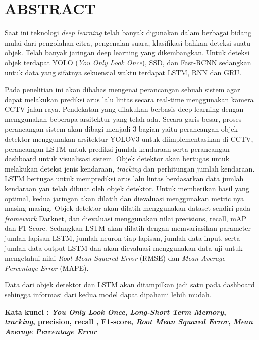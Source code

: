 \documentclass[../thesis.tex]{subfiles}
\begin{document}
\chapter*{ABSTRACT}%
\normalfont
\vspace{1.0cm}
\begin{singlespacing}%
{}

Saat ini teknologi \textit{deep learning} telah banyak digunakan dalam berbagai bidang mulai dari pengolahan citra, pengenalan suara, klasifikasi bahkan deteksi suatu objek. Telah banyak jaringan deep learning yang dikembangkan. Untuk deteksi objek terdapat
YOLO (\textit{You Only Look Once}), SSD, dan Fast-RCNN sedangkan untuk data yang sifatnya sekuensial waktu terdapat LSTM, RNN dan GRU. 

Pada penelitian ini akan dibahas mengenai perancangan sebuah sistem agar dapat melakukan prediksi arus lalu lintas secara real-time menggunakan kamera CCTV jalan raya. Pendekatan yang dilakukan berbasis deep learning dengan menggunakan beberapa arsitektur yang telah ada.
Secara garis besar, proses perancangan sistem akan dibagi menjadi 3 bagian yaitu perancangan objek detektor menggunakan arsitektur YOLOV3 untuk diimplementasikan di CCTV, perancangan LSTM untuk prediksi jumlah kendaraan serta perancangan dashboard untuk visualisasi sistem.
Objek detektor akan bertugas untuk melakukan deteksi jenis kendaraan, \textit{tracking} dan perhitungan jumlah kendaraan. LSTM bertugas untuk memprediksi arus lalu lintas berdasarkan data jumlah kendaraan yan telah dibuat oleh objek detektor. Untuk memberikan hasil yang optimal, kedua jaringan akan dilatih dan dievaluasi menggunakan metric nya masing-masing. 
Objek detektor akan dilatih menggunakan dataset sendiri pada \textit{framework} Darknet, dan dievaluasi menggunakan nilai precisions, recall, mAP dan F1-Score. 
Sedangkan LSTM akan dilatih dengan memvariasikan parameter jumlah lapisan LSTM, jumlah neuron tiap lapisan, jumlah data input, serta jumlah data output LSTM dan akan dievaluasi menggunakan data uji untuk mengetahui nilai \textit{Root Mean Squared Error} (RMSE) dan \textit{Mean Average Percentage Error} (MAPE). 

Data dari objek detektor dan LSTM akan ditampilkan jadi satu pada dashboard sehingga informasi dari kedua model dapat dipahami lebih mudah.

\bigskip
\noindent
\textbf{Kata kunci : \textit{You Only Look Once}, \textit{Long-Short Term Memory}, \textit{tracking}, precision, recall , F1-score, \textit{Root Mean Squared Error}, \textit{Mean Average Percentage Error } }
\end{singlespacing}
\end{document}
